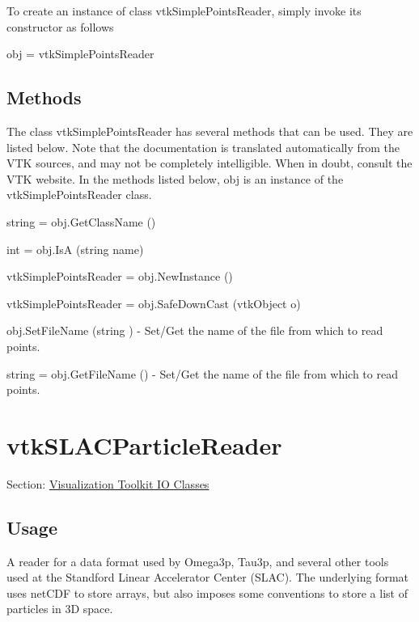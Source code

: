 To create an instance of class vtk\-Simple\-Points\-Reader, simply invoke its constructor as follows \begin{DoxyVerb}  obj = vtkSimplePointsReader
\end{DoxyVerb}
 \hypertarget{vtkwidgets_vtkxyplotwidget_Methods}{}\subsection{Methods}\label{vtkwidgets_vtkxyplotwidget_Methods}
The class vtk\-Simple\-Points\-Reader has several methods that can be used. They are listed below. Note that the documentation is translated automatically from the V\-T\-K sources, and may not be completely intelligible. When in doubt, consult the V\-T\-K website. In the methods listed below, {\ttfamily obj} is an instance of the vtk\-Simple\-Points\-Reader class. 
\begin{DoxyItemize}
\item {\ttfamily string = obj.\-Get\-Class\-Name ()}  
\item {\ttfamily int = obj.\-Is\-A (string name)}  
\item {\ttfamily vtk\-Simple\-Points\-Reader = obj.\-New\-Instance ()}  
\item {\ttfamily vtk\-Simple\-Points\-Reader = obj.\-Safe\-Down\-Cast (vtk\-Object o)}  
\item {\ttfamily obj.\-Set\-File\-Name (string )} -\/ Set/\-Get the name of the file from which to read points.  
\item {\ttfamily string = obj.\-Get\-File\-Name ()} -\/ Set/\-Get the name of the file from which to read points.  
\end{DoxyItemize}\hypertarget{vtkio_vtkslacparticlereader}{}\section{vtk\-S\-L\-A\-C\-Particle\-Reader}\label{vtkio_vtkslacparticlereader}
Section\-: \hyperlink{sec_vtkio}{Visualization Toolkit I\-O Classes} \hypertarget{vtkwidgets_vtkxyplotwidget_Usage}{}\subsection{Usage}\label{vtkwidgets_vtkxyplotwidget_Usage}
A reader for a data format used by Omega3p, Tau3p, and several other tools used at the Standford Linear Accelerator Center (S\-L\-A\-C). The underlying format uses net\-C\-D\-F to store arrays, but also imposes some conventions to store a list of particles in 3\-D space.

